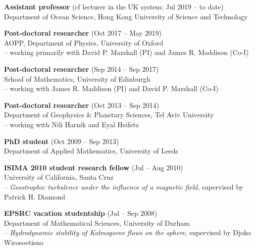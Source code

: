 \documentclass[letterpaper]{article}
\renewenvironment{itemize}{
  \begin{list}{}{
    \setlength{\leftmargin}{1.5em}
  }
}{
  \end{list}
}
\begin{document}
\begin{itemize}

\item \textbf{Assistant professor} (cf lecturer in the UK system; Jul 2019 -- to date)\\
Department of Ocean Science, Hong Kong University of Science and Technology

\item \textbf{Post-doctoral researcher} (Oct 2017 -- May 2019)\\
AOPP, Department of Physics, University of Oxford\\
-- working primarily with David P. Marshall (PI) and James R. Maddison (Co-I) 

\item \textbf{Post-doctoral researcher} (Sep 2014 -- Sep 2017)\\
School of Mathematics, University of Edinburgh\\
-- working with James R. Maddison (PI) and David P. Marshall (Co-I)

\item \textbf{Post-doctoral researcher} (Oct 2013 -- Sep 2014)\\
Department of Geophysics \& Planetary Sciences, Tel Aviv University\\
-- working with Nili Harnik and Eyal Heifetz

\item \textbf{PhD student}  (Oct 2009 -- Sep 2013)\\
Department of Applied Mathematics, University of Leeds
	
\item \textbf{ISIMA 2010 student research fellow} (Jul -- Aug 2010)\\
University of California, Santa Cruz\\
-- \textit{Geostrophic turbulence under the influence of a magnetic field},
supervised by Patrick H. Diamond
	
\item \textbf{EPSRC vacation studentship} (Jul -- Sep 2008)\\
Department of Mathematical Sciences, University of Durham\\
-- \textit{Hydrodynamic stability of Kolmogorov flows on the sphere},
supervised by Djoko Wirosoetisno
	
\end{itemize}
\end{document}
